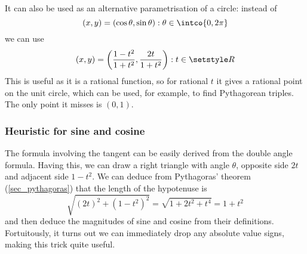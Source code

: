 It can also be used as an alternative parametrisation of a circle: instead
of
\begin{equation*}
(x, y) = (\cos\theta, \sin\theta): \theta \in \intco{0, 2\pi}
\end{equation*}
we can use
\begin{equation*}
(x, y) = \pqty{\dfrac{1 - t^2}{1 + t^2}, \dfrac{2t}{1 + t^2}}: t \in \Reals
\end{equation*}
This is useful as it is a rational function, so for rational \(t\) it gives
a rational point on the unit circle, which can be used, for example, to find
Pythagorean triples. The only point it misses is \((0, 1)\).

\subsubsection{Heuristic for sine and cosine}


The formula involving the tangent can be easily derived from the double
angle formula. Having this, we can draw a right triangle with angle
\(\theta\), opposite side \(2t\) and adjacent side \(1 - t^2\). We can
deduce from Pythagoras' theorem (\ref{sec_pythagoras}) that the length of
the hypotenuse is
\begin{equation*}
\sqrt{(2t)^2 + (1 - t^2)^2} = \sqrt{1 + 2t^2 + t^4} = 1 + t^2
\end{equation*}
and then deduce the magnitudes of sine and cosine from their definitions.
Fortuitously, it turns out we can immediately drop any absolute value
signs, making this trick quite useful.
